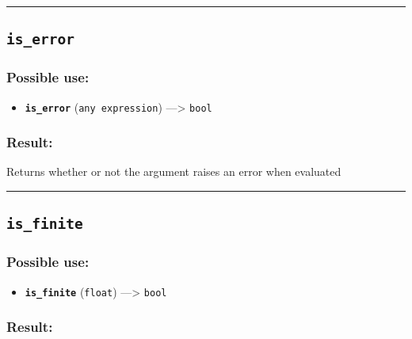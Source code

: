 \documentclass[]{book}
\providecommand{\tightlist}{%
  \setlength{\itemsep}{0pt}\setlength{\parskip}{0pt}}
\theoremstyle{definition}
\theoremstyle{definition}
\theoremstyle{definition}
\theoremstyle{remark}
\begin{document}
\begin{center}\rule{0.5\linewidth}{\linethickness}\end{center}

\subsection{\texorpdfstring{\texttt{is\_error}}{is\_error}}\label{is_error}

\subsubsection{Possible use:}\label{possible-use-287}

\begin{itemize}
\tightlist
\item
  \textbf{\texttt{is\_error}} (\texttt{any\ expression})
  ---\textgreater{} \texttt{bool}
\end{itemize}

\subsubsection{Result:}\label{result-277}

Returns whether or not the argument raises an error when evaluated

\begin{center}\rule{0.5\linewidth}{\linethickness}\end{center}

\subsection{\texorpdfstring{\texttt{is\_finite}}{is\_finite}}\label{is_finite}

\subsubsection{Possible use:}\label{possible-use-288}

\begin{itemize}
\tightlist
\item
  \textbf{\texttt{is\_finite}} (\texttt{float}) ---\textgreater{}
  \texttt{bool}
\end{itemize}

\subsubsection{Result:}\label{result-278}
\end{document}

